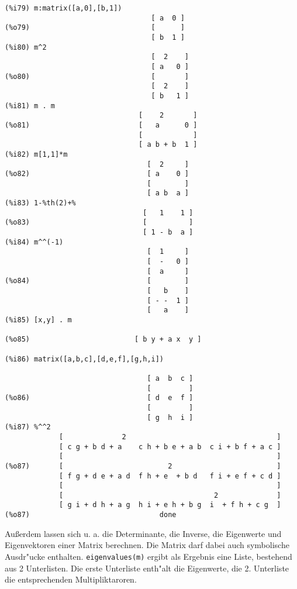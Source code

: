 \documentclass[spanish,12pt,a4paper]{article}
\begin{document}
\scriptsize
\begin{verbatim}
(%i79) m:matrix([a,0],[b,1])
                                   [ a  0 ]
(%o79)                             [      ]
                                   [ b  1 ]
(%i80) m^2
                                   [  2    ]
                                   [ a   0 ]
(%o80)                             [       ]
                                   [  2    ]
                                   [ b   1 ]
(%i81) m . m
                                [    2       ]
(%o81)                          [   a      0 ]
                                [            ]
                                [ a b + b  1 ]
(%i82) m[1,1]*m
                                  [  2     ]
(%o82)                            [ a    0 ]
                                  [        ]
                                  [ a b  a ]
(%i83) 1-%th(2)+%
                                 [   1    1 ]
(%o83)                           [          ]
                                 [ 1 - b  a ]
(%i84) m^^(-1)
                                  [  1     ]
                                  [  -   0 ]
                                  [  a     ]
(%o84)                            [        ]
                                  [   b    ]
                                  [ - -  1 ]
                                  [   a    ]
(%i85) [x,y] . m

(%o85)                         [ b y + a x  y ]

(%i86) matrix([a,b,c],[d,e,f],[g,h,i])

                                  [ a  b  c ]
                                  [         ]
(%o86)                            [ d  e  f ]
                                  [         ]
                                  [ g  h  i ]
(%i87) %^^2
             [              2                                    ]
             [ c g + b d + a    c h + b e + a b  c i + b f + a c ]
             [                                                   ]
(%o87)       [                         2                         ]
             [ f g + d e + a d  f h + e  + b d   f i + e f + c d ]
             [                                                   ]
             [                                    2              ]
             [ g i + d h + a g  h i + e h + b g  i  + f h + c g  ]
(%o87)                               done
\end{verbatim}
\normalsize

Au{\ss}erdem lassen sich u. a. die Determinante, die Inverse, die Eigenwerte und Eigenvektoren einer Matrix berechnen. Die Matrix darf dabei auch symbolische Ausdr"ucke enthalten.
\verb|eigenvalues(m)| ergibt als Ergebnis eine Liste, bestehend aus 2 Unterlisten. Die erste Unterliste enth"alt die Eigenwerte, die 2. Unterliste die entsprechenden Multipliktaroren.
\end{document}
